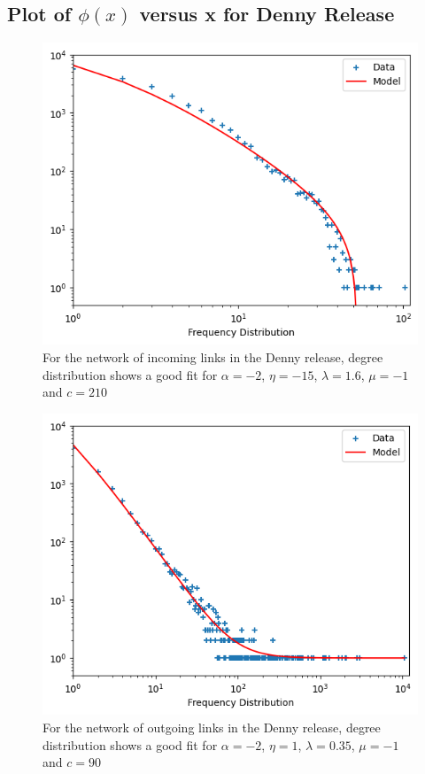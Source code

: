 \documentclass[aps,twocolumn,10pt,reprint]{revtex4}
\begin{document}
\vspace{-5mm}    
\subsection{Plot of $\phi(x)$ versus x for Denny Release }
\vspace{-5mm}
    \begin{figure}[H]
        \centering
        \includegraphics[width=1.0\linewidth, center]{images/lab5_q2_3.png}
        \vspace{-2mm}
        \caption{For the network of incoming links in the Denny release, degree distribution shows a good fit for $\alpha=-2$, $\eta=-15$, $\lambda=1.6$, $\mu = -1$ and $c =210$ }
    \end{figure}
\begin{figure}[H]
        \centering
        \includegraphics[width=1.0\linewidth, center]{images/lab5_q2_4.png}
        \vspace{-2mm}
        \caption{For the network of outgoing links in the Denny release, degree distribution shows a good fit for $\alpha=-2$, $\eta=1$, $\lambda=0.35$, $\mu = -1$ and $c =90$ }
        \label{fig:q2}
    \end{figure}
\end{document}
